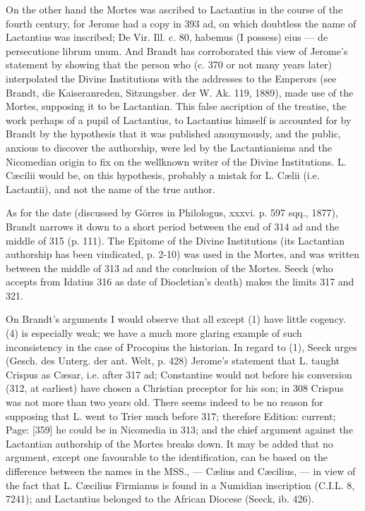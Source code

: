 On the other hand the Mortes was ascribed to Lactantius in the course of the fourth century, for Jerome had a copy in 393 ad, on which doubtless the name of Lactantius was inscribed; De Vir. Ill. c. 80, habemus (I possess) eius \texthebrew{—} de persecutione librum unum. And Brandt has corroborated this view of Jerome\texthebrew{}’s statement by showing that the person who (c. 370 or not many years later) interpolated the Divine Institutions with the addresses to the Emperors (see Brandt, die Kaiseranreden, Sitzungsber. der W. Ak. 119, 1889), made use of the Mortes, supposing it to be Lactantian. This false ascription of the treatise, the work perhaps of a pupil of Lactantius, to Lactantius himself is accounted for by Brandt by the hypothesis that it was published anonymously, and the public, anxious to discover the authorship, were led by the Lactantianisms and the Nicomedian origin to fix on the wellknown writer of the Divine Institutions. L. Cæcilii would be, on this hypothesis, probably a mistak for L. Cælii (i.e. Lactantii), and not the name of the true author.

As for the date (discussed by Görres in Philologus, xxxvi. p. 597 sqq., 1877), Brandt narrows it down to a short period between the end of 314 ad and the middle of 315 (p. 111). The Epitome of the Divine Institutions (its Lactantian authorship has been vindicated, p. 2-10) was used in the Mortes, and was written between the middle of 313 ad and the conclusion of the Mortes. Seeck (who accepts from Idatius 316 as date of Diocletian\texthebrew{}’s death) makes the limits 317 and 321.

On Brandt\texthebrew{}’s arguments I would observe that all except (1) have little cogency. (4) is especially weak; we have a much more glaring example of such inconsistency in the case of Procopius the historian. In regard to (1), Seeck urges (Gesch. des Unterg. der ant. Welt, p. 428) Jerome\texthebrew{}’s statement that L. taught Crispus as Cæsar, i.e. after 317 ad; Constantine would not before his conversion (312, at earliest) have chosen a Christian preceptor for his son; in 308 Crispus was not more than two years old. There seems indeed to be no reason for supposing that L. went to Trier much before 317; therefore Edition: current; Page: [359] he could be in Nicomedia in 313; and the chief argument against the Lactantian authorship of the Mortes breaks down. It may be added that no argument, except one favourable to the identification, can be based on the difference between the names in the MSS., \texthebrew{—} Cælius and Cæcilius, \texthebrew{—} in view of the fact that L. Cæcilius Firmianus is found in a Numidian inscription (C.I.L. 8, 7241); and Lactantius belonged to the African Diocese (Seeck, ib. 426).

